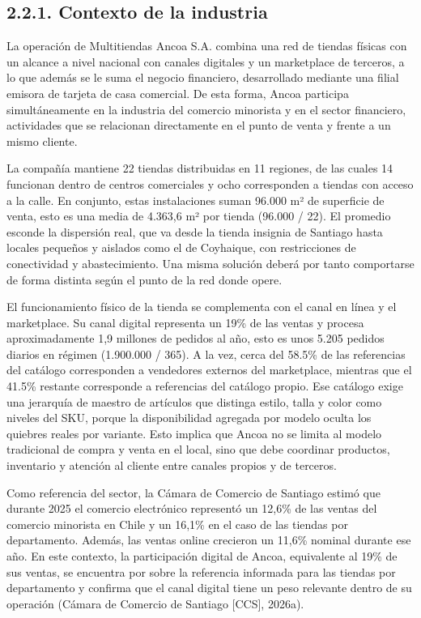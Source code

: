 \documentclass[11pt]{article}
\begin{document}
\subsection{2.2.1. Contexto de la industria}\label{contexto-de-la-industria}

La operación de Multitiendas Ancoa S.A. combina una red de tiendas físicas con un alcance a nivel nacional con canales digitales y un marketplace de terceros, a lo que además se le suma el negocio financiero, desarrollado mediante una filial emisora de tarjeta de casa comercial. De esta forma, Ancoa participa simultáneamente en la industria del comercio minorista y en el sector financiero, actividades que se relacionan directamente en el punto de venta y frente a un mismo cliente.

La compañía mantiene 22 tiendas distribuidas en 11 regiones, de las cuales 14 funcionan dentro de centros comerciales y ocho corresponden a tiendas con acceso a la calle. En conjunto, estas instalaciones suman 96.000 m² de superficie de venta, esto es una media de 4.363,6 m² por tienda (96.000 / 22). El promedio esconde la dispersión real, que va desde la tienda insignia de Santiago hasta locales pequeños y aislados como el de Coyhaique, con restricciones de conectividad y abastecimiento. Una misma solución deberá por tanto comportarse de forma distinta según el punto de la red donde opere.

El funcionamiento físico de la tienda se complementa con el canal en línea y el marketplace. Su canal digital representa un 19\% de las ventas y procesa aproximadamente 1,9 millones de pedidos al año, esto es unos 5.205 pedidos diarios en régimen (1.900.000 / 365). A la vez, cerca del 58.5\% de las referencias del catálogo corresponden a vendedores externos del marketplace, mientras que el 41.5\% restante corresponde a referencias del catálogo propio. Ese catálogo exige una jerarquía de maestro de artículos que distinga estilo, talla y color como niveles del SKU, porque la disponibilidad agregada por modelo oculta los quiebres reales por variante. Esto implica que Ancoa no se limita al modelo tradicional de compra y venta en el local, sino que debe coordinar productos, inventario y atención al cliente entre canales propios y de terceros.

Como referencia del sector, la Cámara de Comercio de Santiago estimó que durante 2025 el comercio electrónico representó un 12,6\% de las ventas del comercio minorista en Chile y un 16,1\% en el caso de las tiendas por departamento. Además, las ventas online crecieron un 11,6\% nominal durante ese año. En este contexto, la participación digital de Ancoa, equivalente al 19\% de sus ventas, se encuentra por sobre la referencia informada para las tiendas por departamento y confirma que el canal digital tiene un peso relevante dentro de su operación (Cámara de Comercio de Santiago {[}CCS{]}, 2026a).
\end{document}
